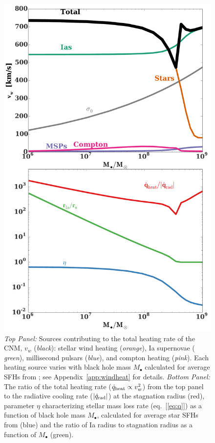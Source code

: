 \documentclass[usenatbib,fleqn]{mn2e}
\newcommand{\Mbh}[1][]{M_{\bullet#1}}
\newcommand{\vwO}{v_{w}}
\begin{document}
\begin{figure}
\includegraphics[width=\columnwidth]{vwSources.pdf}
\caption{\label{fig:vwSources} {\it Top Panel:} Sources contributing
  to the total heating rate of the CNM, $\vwO$ ({\it black}):
  stellar wind heating ({\it orange}), Ia supernovae ({\it
    green}), millisecond pulsars ({\it blue}), and compton heating
  ({\it pink}).  Each heating source varies with black hole mass
  $\Mbh$ calculated for average SFHs from \citet{MosterNaab+:2013a};
  see Appendix~\ref{app:windheat} for details.  {\it Bottom Panel:}
  The ratio of the total heating rate ($\dot{q}_{\rm heat} \propto
  v_{w}^{2}$) from the top panel to the radiative cooling rate
  ($|\dot{q}_{\rm rad}|$) at the stagnation radius (red), parameter $\eta$
  characterizing stellar mass loss rate (eq.~[\ref{eq:q}]) as a
  function of black hole mass $\Mbh$, calculated for average star SFHs
  from \citealt{MosterNaab+:2013a} (blue) and the ratio of Ia radius to
  stagnation radius as a function of $\Mbh$ (green).}
\end{figure}
\end{document}
